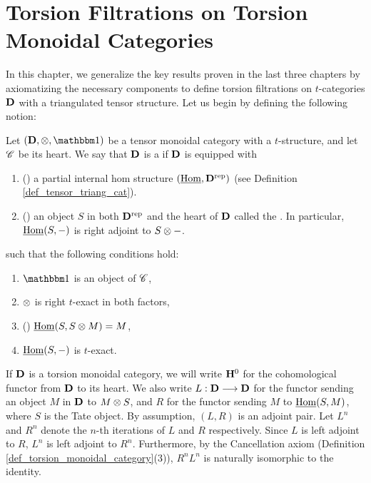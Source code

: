 \newpage
\chapter{Torsion Filtrations on Torsion Monoidal Categories}
\label{sect_filtration_general}

In this chapter, we generalize the key results proven in the last
three chapters by axiomatizing the necessary components to define
torsion filtrations on $t$-categories $\mathbf{D}$ with a triangulated 
tensor structure. Let us begin by defining the following notion:

\begin{defn}\label{def_torsion_monoidal_category}
Let $(\DCat, \tensor, \Unit)$ be a tensor monoidal category with 
a $t$-structure, and let $\mathscr{C}$ be its heart. We say that 
$\mathbf{D}$ is a  if $\mathbf{D}$ is 
equipped with 
\begin{enumerate}
\item () a partial internal hom
structure $(\underline{\mathrm{Hom}}, \mathbf{D}^{\mathrm{rep}})$ (see Definition
\ref{def_tensor_triang_cat}).

\item () an object $S$ in both 
   $\mathbf{D}^{\mathrm{rep}}$ and the heart of $\mathbf{D}$ called the 
   . In particular, $\underline{\mathrm{Hom}}(S, -)$ is right
   adjoint to $S \otimes -$.
\end{enumerate}

\noindent such that the following conditions hold:

\begin{enumerate}
\item $\Unit$ is an object of $\mathscr{C}$,

\item $\otimes$ is right $t$-exact in both factors,

\item () $\underline{\mathrm{Hom}}(S, S \otimes M) = M$,

\item $\underline{\mathrm{Hom}}(S, -)$ is $t$-exact.
\end{enumerate}
\end{defn}

If $\mathbf{D}$ is a torsion monoidal category, we will write $\mathbf{H}^0$
for the cohomological functor from $\mathbf{D}$ to its heart. We also 
write $L: \mathbf{D} \longrightarrow \mathbf{D}$ for the functor sending an object $M$ 
in $\mathbf{D}$ to $M \otimes S$, and $R$ for the functor sending $M$
to $\underline{\mathrm{Hom}}(S, M)$, where $S$ is the Tate object. By assumption,
$(L, R)$ is an adjoint pair. Let $L^n$ and $R^n$ denote the $n$-th 
iterations of $L$ and $R$ respectively. Since $L$ is left adjoint 
to $R$, $L^n$ is left adjoint to $R^n$. Furthermore, by the
Cancellation axiom (Definition 
\ref{def_torsion_monoidal_category}(3)), $R^nL^n$ is naturally 
isomorphic to the identity.

